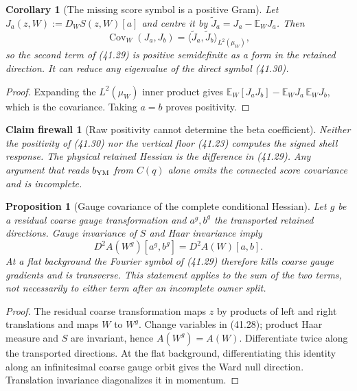 \documentclass[11pt,oneside]{book}
\newtheorem{proposition}[theorem]{Proposition}
\newtheorem{corollary}[theorem]{Corollary}
\newtheorem{firewall}[theorem]{Claim firewall}
\theoremstyle{definition}
\theoremstyle{remark}
\begin{document}
\begin{corollary}[The missing score symbol is a positive Gram]
\label{cor:e8v41-score-Gram}
Let \(J_a(z,W):=D_WS(z,W)[a]\) and centre it by
\(\widetilde J_a=J_a-\mathbb E_WJ_a\).  Then
\[
 \operatorname{Cov}_W(J_a,J_b)
 =\langle\widetilde J_a,\widetilde J_b\rangle_{L^2(\mu_W)},      \tag{41.32}
\]
so the second term of (41.29) is positive semidefinite as a form in
the retained direction.  It can reduce any eigenvalue of the direct
symbol (41.30).
\end{corollary}

\begin{proof}
Expanding the \(L^2(\mu_W)\) inner product gives
\(\mathbb E_W[J_aJ_b]-\mathbb E_WJ_a\,\mathbb E_WJ_b\), which is
the covariance.  Taking \(a=b\) proves positivity.
\end{proof}

\begin{firewall}[Raw positivity cannot determine the beta coefficient]
\label{fire:e8v41-raw-symbol}
Neither the positivity of (41.30) nor the vertical floor (41.23)
computes the signed shell response.  The physical retained Hessian
is the difference in (41.29).  Any argument that reads
\(b_{\rm YM}\) from \(C(q)\) alone omits the connected score
covariance and is incomplete.
\end{firewall}

\begin{proposition}[Gauge covariance of the complete conditional Hessian]
\label{prop:e8v41-coarse-Ward}
Let \(g\) be a residual coarse gauge transformation and
\(a^g,b^g\) the transported retained directions.  Gauge invariance
of \(S\) and Haar invariance imply
\[
 D^2A(W^g)[a^g,b^g]=D^2A(W)[a,b].                               \tag{41.33}
\]
At a flat background the Fourier symbol of (41.29) therefore kills
coarse gauge gradients and is transverse.  This statement applies
to the sum of the two terms, not necessarily to either term after an
incomplete owner split.
\end{proposition}

\begin{proof}
The residual coarse transformation maps \(z\) by products of left
and right translations and maps \(W\) to \(W^g\).  Change variables
in (41.28); product Haar measure and \(S\) are invariant, hence
\(A(W^g)=A(W)\).  Differentiate twice along the transported
directions.  At the flat background, differentiating this identity
along an infinitesimal coarse gauge orbit gives the Ward null
direction.  Translation invariance diagonalizes it in momentum.
\end{proof}
\end{document}

